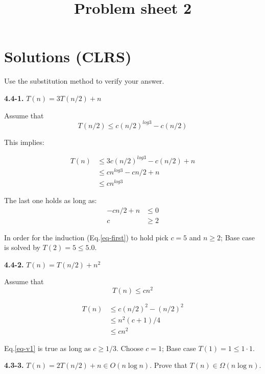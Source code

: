 \documentclass[11pt,a4paper]{article}
\title{Problem sheet 2}
\date{}
\renewcommand{\leq}{\leqslant}
\renewcommand{\geq}{\geqslant}
\begin{document}
\maketitle

\section*{Solutions (CLRS)}
Use the substitution method to verify your answer.


\noindent\textbf{4.4-1.} $T(n) = 3T(n / 2) + n$

Assume that
\begin{equation}
\label{eq-first}
T(n/2) \leq c(n / 2)^{log 3} - c(n/2)
\end{equation}

This implies:

\begin{equation}
\begin{split}
T(n) & \leq 3c(n/2)^{log 3} - c(n/2) + n \\
	 & \leq cn^{log 3} - cn / 2 + n \\
	 & \leq cn^{log 3}
\end{split}
\end{equation}

The last one holds as long as:
\begin{align*}
	-cn/2 + n & \leq 0 \\
	c & \geq 2
\end{align*}
\break

In order for the induction (Eq.\ref{eq-first}) to hold pick $c = 5$ and $n \geq 2$; Base case is solved by $T(2) = 5 \leq 5.0$.


\noindent\textbf{4.4-2.} $T(n) = T(n / 2) + n^2$

Assume that
\begin{equation}
\label{eq-second}
T(n) \leq cn^2
\end{equation}

\begin{equation}
\label{eq-v1}
\begin{split}
T(n) & \leq c(n/2)^{2} - (n/2)^2 \\
	 & \leq n^2(c+1)/4 \\
	 & \leq cn^2
\end{split}
\end{equation}

Eq.\ref{eq-v1} is true as long as $c \geq 1/3$. Choose $c=1$; Base case $T(1) = 1 \leq 1 \cdot 1$.


\noindent\textbf{4.3-3.} $T(n) = 2T(n / 2) + n \in O(n \log{n})$. Prove that $T(n) \in \Omega(n \log{n})$.
\end{document}
